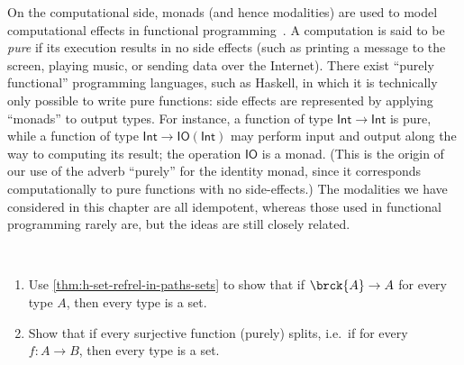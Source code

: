 On the computational side, monads (and hence modalities) are used to model computational effects in functional programming~\cite{Moggi89}.%
%
A computation is said to be \emph{pure} if its execution results in no side effects (such as printing a message to the screen, playing music, or sending data over the Internet).
There exist ``purely functional'' programming languages, such as Haskell, in which it is technically only possible to write pure functions: side effects are represented by applying ``monads'' to output types.
For instance, a function of type $\mathsf{Int}\to\mathsf{Int}$ is pure, while a function of type $\mathsf{Int}\to \mathsf{IO}(\mathsf{Int})$ may perform input and output along the way to computing its result; the operation $\mathsf{IO}$ is a monad.
%
(This is the origin of our use of the adverb ``purely'' for the identity monad, since it corresponds computationally to pure functions with no side-effects.)
The modalities we have considered in this chapter are all idempotent, whereas those used in functional programming rarely are, but the ideas are still closely related.


\sectionExercises

\begin{ex}\label{ex:all-types-sets}\
  \begin{enumerate}
    \item Use \cref{thm:h-set-refrel-in-paths-sets} to show
    that if $\brck{A}\to A$ for every type $A$,
    then every type is a set.
    \item Show that if every surjective function (purely) splits,
    i.e.~if
    for every $f:A\to B$, then every type is a set.
  \end{enumerate}
\end{ex}

